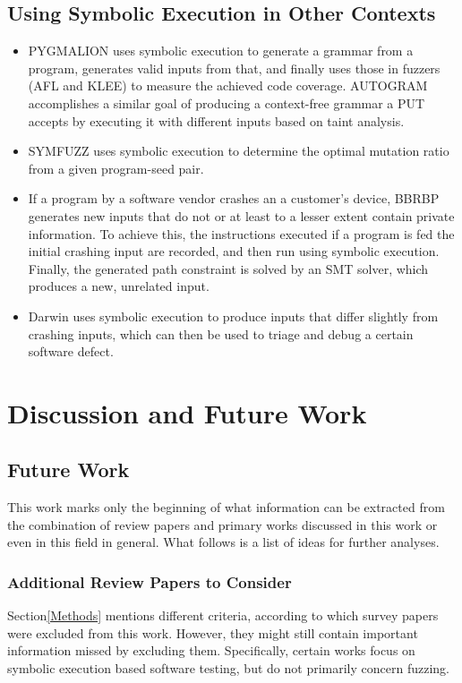 \documentclass{article}
\begin{document}
\begin{multicols}{2}
    \subsection{Using Symbolic Execution in Other Contexts}
    \begin{itemize}
        \item PYGMALION\cite{PYGMALION} uses symbolic execution to generate a grammar from a program, generates valid inputs from that, and finally uses those in fuzzers (AFL\cite{AFLPlusPlus} and KLEE\cite{KLEE}) to measure the achieved code coverage. AUTOGRAM\cite{AUTOGRAM} accomplishes a similar goal of producing a context-free grammar a PUT accepts by executing it with different inputs based on taint analysis.
        \item SYMFUZZ\cite{SYMFUZZ} uses symbolic execution to determine the optimal mutation ratio from a given program-seed pair.
        \item If a program by a software vendor crashes an a customer's device, BBRBP\cite{BBRBP} generates new inputs that do not or at least to a lesser extent contain private information. To achieve this, the instructions executed if a program is fed the initial crashing input are recorded, and then run using symbolic execution. Finally, the generated path constraint is solved by an SMT solver, which produces a new, unrelated input.
        \item Darwin\cite{Darwin} uses symbolic execution to produce inputs that differ slightly from crashing inputs, which can then be used to triage and debug a certain software defect.
    \end{itemize}

    \section{Discussion and Future Work}
    \label{Discussion}
    \subsection{Future Work}
    This work marks only the beginning of what information can be extracted from the combination of review papers and primary works discussed in this work or even in this field in general. What follows is a list of ideas for further analyses.

    \subsubsection{Additional Review Papers to Consider}
    Section\ref{Methods} mentions different criteria, according to which survey papers were excluded from this work. However, they might still contain important information missed by excluding them. Specifically, certain works\cite{DSETestGeneration, SurveySymbex, SearchStrategies, NewTrendsSymbex} focus on symbolic execution based software testing, but do not primarily concern fuzzing.


\end{multicols}
\end{document}
